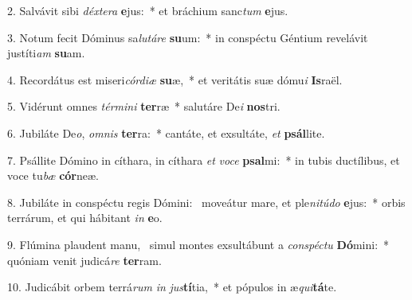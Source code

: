 2. Salvávit sibi \textit{déx}\textit{te}\textit{ra} \textbf{e}jus:~*  et bráchium sanc\textit{tum} \textbf{e}jus.\

3. Notum fecit Dóminus sa\textit{lu}\textit{tá}\textit{re} \textbf{su}um:~*  in conspéctu Géntium revelávit justíti\textit{am} \textbf{su}am.\

4. Recordátus est miseri\textit{cór}\textit{di}\textit{æ} \textbf{su}æ,~*  et veritátis suæ dómu\textit{i} \textbf{Is}raël.\

5. Vidérunt omnes \textit{tér}\textit{mi}\textit{ni} \textbf{ter}ræ~*  salutáre De\textit{i} \textbf{nos}tri.\

6. Jubiláte De\textit{o}, \textit{om}\textit{nis} \textbf{ter}ra:~*  cantáte, et exsultáte, \textit{et} \textbf{psál}lite.\

7. Psállite Dómino in cíthara, in cíthara \textit{et} \textit{vo}\textit{ce} \textbf{psal}mi:~*  in tubis ductílibus, et voce tu\textit{bæ} \textbf{cór}neæ.\

8. Jubiláte in conspéctu regis Dómini: \dag\  moveátur mare, et ple\textit{ni}\textit{tú}\textit{do} \textbf{e}jus:~*  orbis terrárum, et qui hábitant \textit{in} \textbf{e}o.\

9. Flúmina plaudent manu, \dag\  simul montes exsultábunt a \textit{con}\textit{spéc}\textit{tu} \textbf{Dó}mini:~*  quóniam venit judicá\textit{re} \textbf{ter}ram.\

10. Judicábit orbem terrá\textit{rum} \textit{in} \textit{jus}\textbf{tí}tia,~*  et pópulos in æ\textit{qui}\textbf{tá}te.\

